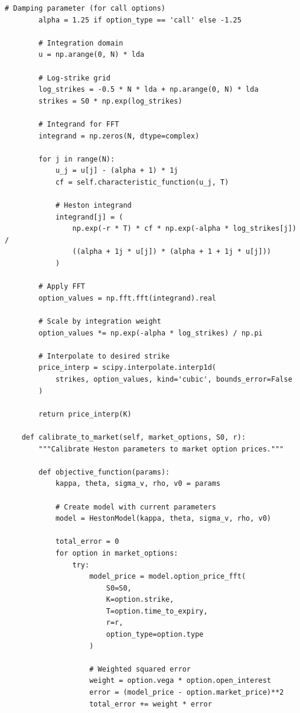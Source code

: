 \documentclass[12pt,a4paper]{article}
\theoremstyle{definition}
\theoremstyle{remark}
\begin{document}
\begin{lstlisting}[caption=Heston Model Implementation]
        # Damping parameter (for call options)
        alpha = 1.25 if option_type == 'call' else -1.25
        
        # Integration domain
        u = np.arange(0, N) * lda
        
        # Log-strike grid
        log_strikes = -0.5 * N * lda + np.arange(0, N) * lda
        strikes = S0 * np.exp(log_strikes)
        
        # Integrand for FFT
        integrand = np.zeros(N, dtype=complex)
        
        for j in range(N):
            u_j = u[j] - (alpha + 1) * 1j
            cf = self.characteristic_function(u_j, T)
            
            # Heston integrand
            integrand[j] = (
                np.exp(-r * T) * cf * np.exp(-alpha * log_strikes[j]) /
                ((alpha + 1j * u[j]) * (alpha + 1 + 1j * u[j]))
            )
        
        # Apply FFT
        option_values = np.fft.fft(integrand).real
        
        # Scale by integration weight
        option_values *= np.exp(-alpha * log_strikes) / np.pi
        
        # Interpolate to desired strike
        price_interp = scipy.interpolate.interp1d(
            strikes, option_values, kind='cubic', bounds_error=False
        )
        
        return price_interp(K)
    
    def calibrate_to_market(self, market_options, S0, r):
        """Calibrate Heston parameters to market option prices."""
        
        def objective_function(params):
            kappa, theta, sigma_v, rho, v0 = params
            
            # Create model with current parameters
            model = HestonModel(kappa, theta, sigma_v, rho, v0)
            
            total_error = 0
            for option in market_options:
                try:
                    model_price = model.option_price_fft(
                        S0=S0,
                        K=option.strike,
                        T=option.time_to_expiry,
                        r=r,
                        option_type=option.type
                    )
                    
                    # Weighted squared error
                    weight = option.vega * option.open_interest
                    error = (model_price - option.market_price)**2
                    total_error += weight * error
                    

\end{lstlisting}
\end{document}
